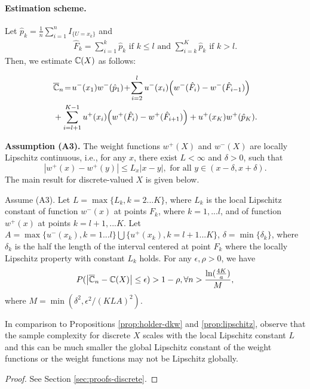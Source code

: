 \paragraph{Estimation scheme.} 
Let $\hat p_k= \frac{1}{n} \sum_{i=1}^n I_{\{U =x_k\}}$ and 
\begin{align}
\label{eq:Fkhat}
 \hat F_k = 
   \sum_{i=1}^k \hat p_k  \text{ if   } k \leq l \text{ and }
   \sum_{i=k}^K \hat p_k  \text{ if  }  k > l.
\end{align}
Then, we estimate $\mathbb{C}(X)$ as follows:
\begin{small}
\begin{align}
&\overline {\mathbb{C}}_n \!=\! 
u^-(x_1) w^-(\hat p_1) \!+\!\sum_{i=2}^l u^-(x_i) \Big(w^-(\hat F_i) - w^-( \hat F_{i-1})\Big) 
\nonumber\\
&
+ \sum_{i=l+1}^{K-1} u^+(x_i) \Big(w^+(\hat F_i) - w^+(\hat F_{i+1}) \Big) + u^+(x_K) w^+(\hat p_K). \label{eq:cpt-discrete-est}
\end{align}
\end{small}
\textbf{Assumption (A3).}  The weight functions $w^+(X)$ and $w^-(X)$ are locally Lipschitz continuous, i.e., for any $x$, there exist  $L< \infty$ and $\delta>0$, such that
$$| w^+(x) - w^+(y) | \leq L_x |x-y|, \text{ for all } y \in (x-\delta,x+\delta). $$
The main result for discrete-valued $X$ is given below.
\begin{proposition}
\label{prop:sample-complexity-discrete}
Assume (A3). Let $L=\max\{L_k, k=2...K\} $, where $L_k$ is the local Lipschitz constant of function $w^-(x)$ at points
$F_k$, where $k=1,...l$, and of function $w^+(x)$ at points $k=l+1,...K$. 
Let $A=\max\{u^{-}(x_k), k=1...l\} \bigcup \{u^{+}(x_k), k=l+1...K\}$, $\delta =\min\{\delta_k\}$, where $\delta_k$ is the half the length of the interval centered at point $F_k$ where the locally Lipschitz property with constant $L_k$ holds.
For any $\epsilon,\rho >0$, we have 
\begin{align}
P(\left|
\overline {\mathbb{C}}_n -\mathbb{C}(X)
\right| \leq \epsilon) > 1-\rho, \forall n> \frac{\ln(\frac{4K}{a})} { M}, 
\end{align}
where $M=\min(\delta^2, \epsilon^2/(KLA)^2)$.
\end{proposition}
In comparison to Propositions \ref{prop:holder-dkw} and \ref{prop:lipschitz}, 
observe that the sample complexity for discrete $X$ scales with the local Lipschitz constant $L$ and this can be much smaller the global Lipschitz constant of the weight functions or the weight functions may not be Lipschitz globally.  
\begin{proof}
 See Section \ref{sec:proofs-discrete}.
\end{proof}

